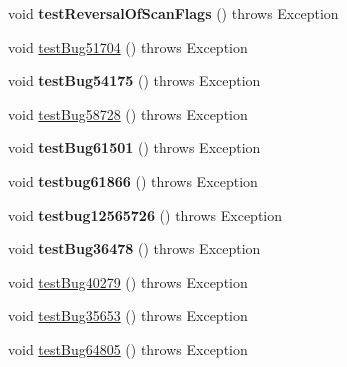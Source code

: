 \begin{DoxyCompactItemize}
void {\bfseries test\+Reversal\+Of\+Scan\+Flags} ()  throws Exception 
\item 
void \mbox{\hyperlink{classtestsuite_1_1regression_1_1_statement_regression_test_ae340966f884a71e95d8ff3df860c27e6}{test\+Bug51704}} ()  throws Exception 
\item 
\mbox{\label{classtestsuite_1_1regression_1_1_statement_regression_test_a58e585594c886a2bc7d1179b9be2d1c2}} 
void {\bfseries test\+Bug54175} ()  throws Exception 
\item 
void \mbox{\hyperlink{classtestsuite_1_1regression_1_1_statement_regression_test_a84dc5a1748d9651df8f09ae7b8e2fd2b}{test\+Bug58728}} ()  throws Exception 
\item 
\mbox{\label{classtestsuite_1_1regression_1_1_statement_regression_test_a9a35d52eb464cf7089e61c04944d9c4d}} 
void {\bfseries test\+Bug61501} ()  throws Exception 
\item 
\mbox{\label{classtestsuite_1_1regression_1_1_statement_regression_test_a8cccba0c2f85f3a64228f15cb1973073}} 
void {\bfseries testbug61866} ()  throws Exception 
\item 
\mbox{\label{classtestsuite_1_1regression_1_1_statement_regression_test_a7c42f31415085e3dc5b8531b4f5b1a6d}} 
void {\bfseries testbug12565726} ()  throws Exception 
\item 
\mbox{\label{classtestsuite_1_1regression_1_1_statement_regression_test_a683128ef39eee9bd631d50121aa58fc8}} 
void {\bfseries test\+Bug36478} ()  throws Exception 
\item 
void \mbox{\hyperlink{classtestsuite_1_1regression_1_1_statement_regression_test_adcee0bfb85026b28841f5a0cd08125a2}{test\+Bug40279}} ()  throws Exception 
\item 
void \mbox{\hyperlink{classtestsuite_1_1regression_1_1_statement_regression_test_a40b2d7e9258863dc6ad385628b08e04d}{test\+Bug35653}} ()  throws Exception 
\item 
void \mbox{\hyperlink{classtestsuite_1_1regression_1_1_statement_regression_test_af54f8dc05c901b420749b5525d6b1db9}{test\+Bug64805}} ()  throws Exception 

\end{DoxyCompactItemize}
